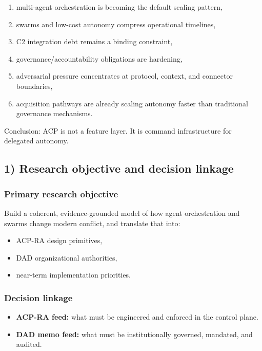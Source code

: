 \documentclass[11pt]{article}
\begin{document}
\begin{enumerate}
\def\labelenumi{\arabic{enumi}.}
\tightlist
\item
  multi-agent orchestration is becoming the default scaling pattern,
\item
  swarms and low-cost autonomy compress operational timelines,
\item
  C2 integration debt remains a binding constraint,
\item
  governance/accountability obligations are hardening,
\item
  adversarial pressure concentrates at protocol, context, and connector
  boundaries,
\item
  acquisition pathways are already scaling autonomy faster than
  traditional governance mechanisms.
\end{enumerate}

Conclusion: ACP is not a feature layer. It is command infrastructure for
delegated autonomy.

\hypertarget{research-objective-and-decision-linkage}{%
\subsection{1) Research objective and decision
linkage}\label{research-objective-and-decision-linkage}}

\hypertarget{primary-research-objective}{%
\subsubsection{Primary research
objective}\label{primary-research-objective}}

Build a coherent, evidence-grounded model of how agent orchestration and
swarms change modern conflict, and translate that into:

\begin{itemize}
\tightlist
\item
  ACP-RA design primitives,
\item
  DAD organizational authorities,
\item
  near-term implementation priorities.
\end{itemize}

\hypertarget{decision-linkage}{%
\subsubsection{Decision linkage}\label{decision-linkage}}

\begin{itemize}
\tightlist
\item
  \textbf{ACP-RA feed:} what must be engineered and enforced in the
  control plane.
\item
  \textbf{DAD memo feed:} what must be institutionally governed,
  mandated, and audited.
\end{itemize}
\end{document}
